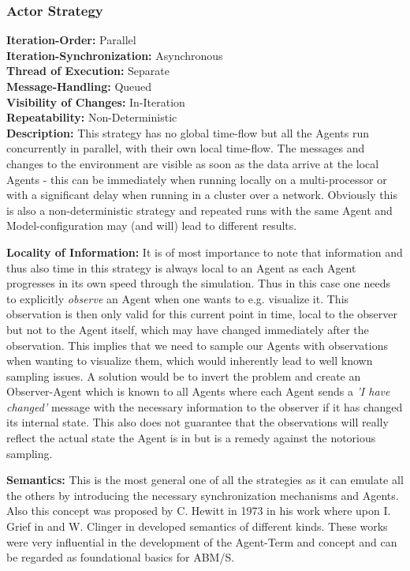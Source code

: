 \subsubsection{Actor Strategy}
\textbf{Iteration-Order:} Parallel \\
\textbf{Iteration-Synchronization:}	Asynchronous \\
\textbf{Thread of Execution:} Separate \\
\textbf{Message-Handling:} Queued \\
\textbf{Visibility of Changes:}	In-Iteration \\
\textbf{Repeatability:}	Non-Deterministic \\

\textbf{Description:} This strategy has no global time-flow but all the Agents run concurrently in parallel, with their own local time-flow. The messages and changes to the environment are visible as soon as the data arrive at the local Agents - this can be immediately when running locally on a multi-processor or with a significant delay when running in a cluster over a network. Obviously this is also a non-deterministic strategy and repeated runs with the same Agent and Model-configuration may (and will) lead to different results.

\textbf{Locality of Information:} It is of most importance to note that information and thus also time in this strategy is always local to an Agent as each Agent progresses in its own speed through the simulation. Thus in this case one needs to explicitly \textit{observe} an Agent when one wants to e.g. visualize it. This observation is then only valid for this current point in time, local to the observer but not to the Agent itself, which may have changed immediately after the observation. This implies that we need to sample our Agents with observations when wanting to visualize them, which would inherently lead to well known sampling issues. A solution would be to invert the problem and create an Observer-Agent which is known to all Agents where each Agent sends a \textit{'I have changed'} message with the necessary information to the observer if it has changed its internal state. This also does not guarantee that the observations will really reflect the actual state the Agent is in but is a remedy against the notorious sampling. 

\textbf{Semantics:} This is the most general one of all the strategies as it can emulate all the others by introducing the necessary synchronization mechanisms and Agents. Also this concept was proposed by C. Hewitt in 1973 in his work \cite{hewitt_universal_1973} where upon I. Grief in \cite{grief_semantics_1975} and W. Clinger in \cite{clinger_foundations_1981} developed semantics of different kinds. These works were very influential in the development of the Agent-Term and concept and can be regarded as foundational basics for ABM/S.

